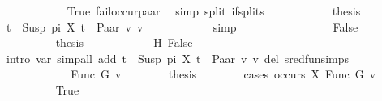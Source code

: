 \begin{isabellebody}
\ \ \ \ \ \ \ \ \ \ \isamarkupfalse%
\ True\ fail{\isacharunderscore}{\kern0pt}occur{\isacharunderscore}{\kern0pt}paar\ \isamarkupfalse%
\ {\isacharparenleft}{\kern0pt}simp\ split{\isacharcolon}{\kern0pt}\ if{\isacharunderscore}{\kern0pt}splits{\isacharparenright}{\kern0pt}\isanewline
\ \ \ \ \ \ \ \ \isamarkupfalse%
\ \isamarkupfalse%
\ {\isacharquery}{\kern0pt}thesis\ \isamarkupfalse%
\ {\isacartoucheopen}t{}\ {\isacharequal}{\kern0pt}\ Susp\ pi\ X{\isacartoucheclose}\ {\isacartoucheopen}t{}\ {\isacharequal}{\kern0pt}\ Paar\ v{}\ v{}{\isacartoucheclose}\isanewline
\ \ \ \ \ \ \ \ \ \ \isamarkupfalse%
\ simp\isanewline
\ \ \ \ \ \ \isamarkupfalse%
\isanewline
\ \ \ \ \ \ \ \ \isamarkupfalse%
\ False\isanewline
\ \ \ \ \ \ \ \ %
\isanewline
\ \ \ \ \ \ \ \ \isamarkupfalse%
\ {\isacharquery}{\kern0pt}thesis\isanewline
\ \ \ \ \ \ \ \ \ \ \isamarkupfalse%
\ H\ False\ \isamarkupfalse%
\ {\isacharparenleft}{\kern0pt}intro\ var{\isacharunderscore}{\kern0pt}{}{\isacharparenright}{\kern0pt}\ {\isacharparenleft}{\kern0pt}simp{\isacharunderscore}{\kern0pt}all\ add{\isacharcolon}{\kern0pt}\ {\isacartoucheopen}t{}\ {\isacharequal}{\kern0pt}\ Susp\ pi\ X{\isacartoucheclose}\ {\isacartoucheopen}t{}\ {\isacharequal}{\kern0pt}\ Paar\ v{}\ v{}{\isacartoucheclose}\ del{\isacharcolon}{\kern0pt}\ sred{\isacharunderscore}{\kern0pt}fun{\isachardot}{\kern0pt}simps{\isacharparenright}{\kern0pt}\isanewline
\ \ \ \ \ \ \isamarkupfalse%
\isanewline
\ \ \ \ \isamarkupfalse%
\isanewline
\ \ \ \ \ \ \isamarkupfalse%
\ {\isacharparenleft}{\kern0pt}Func\ G\ v{\isacharparenright}{\kern0pt}\isanewline
\ \ \ \ \ \ \isamarkupfalse%
\ {\isacharquery}{\kern0pt}thesis\isanewline
\ \ \ \ \ \ \isamarkupfalse%
\ {\isacharparenleft}{\kern0pt}cases\ {\isachardoublequoteopen}occurs\ X\ {\isacharparenleft}{\kern0pt}Func\ G\ v{\isacharparenright}{\kern0pt}{\isachardoublequoteclose}{\isacharparenright}{\kern0pt}\isanewline
\ \ \ \ \ \ \ \ \isamarkupfalse%
\ True\isanewline
\ \ \ \ \ \ \ \ %
\end{isabellebody}

